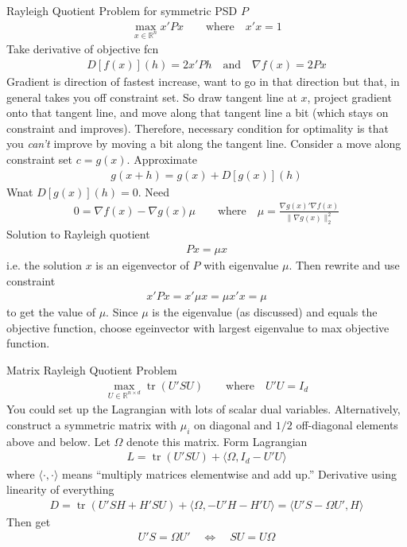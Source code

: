 \documentclass[12pt]{article}
\numberwithin{equation}{section} %
\theoremstyle{plain}
\theoremstyle{definition}
\theoremstyle{remark}
\newcommand{\trace}{\operatorname{tr}}
\newcommand{\R}{\mathbb{R}}
\newcommand{\Rn}{\mathbb{R}^n}
\begin{document}
Rayleigh Quotient Problem
for symmetric PSD $P$
\begin{align*}
  \max_{x\in\Rn} x'Px
  \qquad\text{where}\quad
  x'x=1
\end{align*}
Take derivative of objective fcn
\begin{align*}
  D[f(x)](h) = 2x'Ph
  \quad\text{and}\quad
  \nabla f(x) = 2Px
\end{align*}
Gradient is direction of fastest increase, want to go in that direction
but that, in general takes you off constraint set. So draw tangent line
at $x$, project gradient onto that tangent line, and move along that
tangent line a bit (which stays on constraint and improves).
Therefore, necessary condition for optimality is that you \emph{can't}
improve by moving a bit along the tangent line.
Consider a move along constraint set $c=g(x)$.
Approximate
\begin{align*}
  g(x+h)=g(x)+D[g(x)](h)
\end{align*}
Wnat $D[g(x)](h)=0$.
Need
\begin{align*}
  0 = \nabla f(x)-\nabla g(x)\mu
  \qquad\text{where}\quad
  \mu=
  \frac{\nabla g(x)'\nabla f(x)}{\lVert\nabla g(x)\rVert^2_2}
\end{align*}
Solution to Rayleigh quotient
\begin{align*}
  Px=\mu x
\end{align*}
i.e. the solution $x$ is an eigenvector of $P$ with eigenvalue $\mu$.
Then rewrite and use constraint
\begin{align*}
  x'Px=x'\mu x=\mu x'x = \mu
\end{align*}
to get the value of $\mu$.
Since $\mu$ is the eigenvalue (as discussed) and equals the objective
function, choose egeinvector with largest eigenvalue to max objective
function.

Matrix Rayleigh Quotient Problem
\begin{align*}
  \max_{U\in\R^{n\times d}} \trace(U'SU)
  \qquad\text{where}\quad
  U'U=I_d
\end{align*}
You could set up the Lagrangian with lots of scalar dual variables.
Alternatively, construct a symmetric matrix with $\mu_i$ on diagonal and
$1/2$ off-diagonal elements above and below.
Let $\Omega$ denote this matrix.
Form Lagrangian
\begin{align*}
  L=\trace(U'SU) + \langle \Omega,I_d-U'U\rangle
\end{align*}
where $\langle\cdot,\cdot\rangle$ means ``multiply matrices elementwise
and add up.''
Derivative using linearity of everything
\begin{align*}
  D = \trace(U'SH+H'SU)+\langle \Omega,-U'H-H'U\rangle
  = \langle U'S-\Omega U',H\rangle
\end{align*}
Then get
\begin{align*}
  U'S=\Omega U'
  \quad\iff\quad
  SU=U\Omega
\end{align*}
\end{document}
